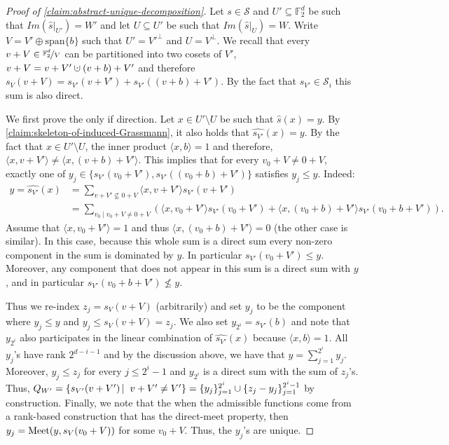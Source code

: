 \documentclass[10pt,a4paper]{article}
\newcommand{\prettyref}[1]{\cref{#1}}
\theoremstyle{definition}
\theoremstyle{remark}
\newcommand\sett[2]{\left\{ #1 \left| \; \vphantom{#1 #2} \right. #2  \right\}}
\newcommand{\set}[1]{\{#1\}}
\newcommand{\iprod}[1]{\langle#1\rangle}
\def\sp{\mathrm{ span}}
\newcommand{\F}{\mathbb{F}}
\renewcommand{\leq}{\leqslant}
\numberwithin{equation}{section}
\newcommand{\dunion}{\mathbin{\mathaccent\cdot\cup}}
\let\pref=\prettyref
\def\Meet{\textup{Meet}}
\begin{document}
\begin{proof}[Proof of \pref{claim:abstract-unique-decomposition}]
    Let \(s \in \mathcal{S}\) and \(U' \subseteq \F_2^{d}\) be such that \(Im(\widehat{s}|_{U'}) = W'\) and let \(U \subseteq U'\) be such that \(Im(\widehat{s}|_{U}) = W\). Write \(V = V' \oplus \sp \set{b}\) such that \(U'=V'^{\bot}\) and \(U=V^\bot\). We recall that every \(v+V \in \nicefrac{\F_2^d}{V}\) can be partitioned into two cosets of \(V'\), \(v+V = v+V' \dunion (v+b)+V'\) and therefore \(s_V(v+V) = s_{V'}(v+V') + s_{V'}((v+b)+V')\). By the fact that \(s_{V'} \in \mathcal{S}_i\) this sum is also direct.
    
    We first prove the only if direction. Let \(x \in U' \setminus U\) be such that \(\widehat{s}(x)=y\). By \pref{claim:skeleton-of-induced-Grassmann}, it also holds that \(\widehat{s_{V'}}(x)=y\). By the fact that \(x \in U' \setminus U\), the inner product \(\iprod{x,b} = 1\) and therefore, \(\iprod{x,v+V'} \ne \iprod{x,(v+b)+V'}\). This implies that for every \(v_0+V \ne 0+V\), exactly one of \(y_j \in \set{s_{V'}(v_0+V'), s_{V'}((v_0+b)+V')}\) satisfies \(y_j \leq y\). Indeed:
    \begin{align*}
        y = \widehat{s_{V'}}(x) &= \sum_{v+V' \not\subseteq 0+V} \iprod{x,v+V'}s_{V'}(v+V') \\
    &= \sum_{v_0 \mid v_0+V\neq 0+V} \left( \iprod{x,v_0+V'}s_{V'}(v_0+V') + \iprod{x,(v_0+b)+V'}s_{V'}(v_0+b+V')\right).
    \end{align*}
Assume that \(\iprod{x,v_0+V'}=1\) and thus \(\iprod{x,(v_0+b)+V'} = 0\) (the other case is similar). In this case, because this whole sum is a direct sum every non-zero component in the sum is dominated by $y$. In particular \(s_{V'}(v_0+V') \leq y\). Moreover, any component that does not appear in this sum is a direct sum with \(y\), and in particular \(s_{V'}(v_0+b+V') \not \leq y\).

Thus we re-index \(z_j = s_V(v+V)\) (arbitrarily) and set \(y_j\) to be the component where \(y_j \leq y\) and \(y_j \leq s_V(v+V) = z_j\). We also set \(y_{2^i} = s_{V'}(b)\) and note that \(y_{2^i}\) also participates in the linear combination of \(\widehat{s_{V'}}(x)\) because \(\iprod{x,b}=1\). All \(y_j\)'s have rank \(2^{d-i-1}\) and by the discussion above, we have that \(y = \sum_{j=1}^{2^i} y_j\). Moreover, \(y_j \leq z_j\) for every \(j \leq 2^i-1\) and \(y_{2^i}\) is a direct sum with the sum of \(z_j\)'s. Thus, \(Q_{W'} = \sett{s_{V'}(v+V')}{v+V' \ne V'} = \set{y_j}_{j=1}^{2^i} \cup \set{z_j-y_j}_{j=1}^{2^i - 1}\) by construction. Finally, we note that the when the admissible functions come from a rank-based construction that has the direct-meet property, then \(y_j = \Meet(y,s_{V}(v_0+V))\) for some \(v_0 + V\). Thus, the \(y_j\)'s are unique.


\end{proof}
\end{document}
